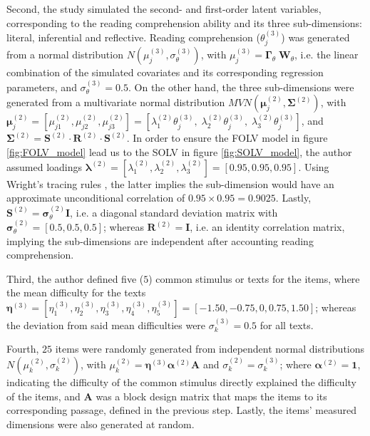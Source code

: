 Second, the study simulated the second- and first-order latent variables, corresponding to the reading comprehension ability and its three sub-dimensions: literal, inferential and reflective. Reading comprehension ($\theta^{(3)}_{j}$) was generated from a normal distribution $N( \mu^{(3)}_{j}, \sigma^{(3)}_{\theta} )$, with $\mu^{(3)}_{j} = \pmb{\Gamma}_{\theta} \; \mathbf{W}_{\theta}$, i.e. the linear combination of the simulated covariates and its corresponding regression parameters, and $\sigma^{(3)}_{\theta}=0.5$. On the other hand, the three sub-dimensions were generated from a multivariate normal distribution $MVN( \pmb{\mu}^{(2)}_{j} , \pmb{\Sigma}^{(2)})$, with $\pmb{\mu}^{(2)}_{j} = [\mu^{(2)}_{j1}, \mu^{(2)}_{j2}, \mu^{(2)}_{j3}] = [\lambda^{(2)}_{1} \theta^{(3)}_{j}, \; \lambda^{(2)}_{2} \theta^{(3)}_{j}, \; \lambda^{(2)}_{3} \theta^{(3)}_{j} ]$, and $\pmb{\Sigma}^{(2)} = \mathbf{S}^{(2)} \cdot \mathbf{R}^{(2)} \cdot \mathbf{S}^{(2)}$. In order to ensure the FOLV model in figure \ref{fig:FOLV_model} lead us to the SOLV in figure \ref{fig:SOLV_model}, the author assumed loadings $\pmb{\lambda}^{(2)} = [\lambda^{(2)}_{1}, \lambda^{(2)}_{2}, \lambda^{(2)}_{3}] = [0.95, 0.95, 0.95]$. Using Wright's tracing rules \cite{Beaujean_2014}, the latter implies the sub-dimension would have an approximate unconditional correlation of $0.95 \times 0.95 = 0.9025$. Lastly, $\mathbf{S}^{(2)} = \pmb{\sigma}^{(2)}_{\theta} \mathbf{I}$, i.e. a diagonal standard deviation matrix with $\pmb{\sigma}^{(2)}_{\theta} = [0.5, 0.5, 0.5]$; whereas $\mathbf{R}^{(2)} = \mathbf{I}$, i.e. an identity correlation matrix, implying the sub-dimensions are independent after accounting reading comprehension.

Third, the author defined five ($5$) common stimulus or texts for the items, where the mean difficulty for the texts $\pmb{\eta}^{(3)} = [\eta^{(3)}_{1}, \eta^{(3)}_{2}, \eta^{(3)}_{3}, \eta^{(3)}_{4}, \eta^{(3)}_{5}] = [-1.50, -0.75, 0, 0.75, 1.50]$; whereas the deviation from said mean difficulties were $\sigma^{(3)}_{k} = 0.5$ for all texts. 

Fourth, $25$ items were randomly generated from independent normal distributions $N( \mu^{(2)}_{k}, \sigma^{(2)}_{k} ) $, with $\mu^{(2)}_{k} = \pmb{\eta}^{(3)} \pmb{\alpha}^{(2)} \mathbf{A}$ and $\sigma^{(2)}_{k} = \sigma^{(3)}_{k}$; where $\pmb{\alpha}^{(2)} = \mathbf{1}$, indicating the difficulty of the common stimulus directly explained the difficulty of the items, and $\mathbf{A}$ was a block design matrix that maps the items to its corresponding passage, defined in the previous step. Lastly, the items' measured dimensions were also generated at random.

